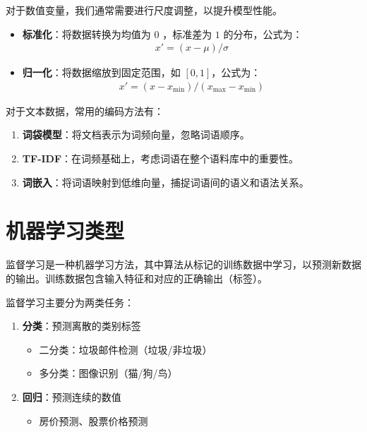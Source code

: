 \begin{example}[数值变量的标准化与归一化]
    对于数值变量，我们通常需要进行尺度调整，以提升模型性能。
    \begin{itemize}
        \item \textbf{标准化}：将数据转换为均值为 $0$ ，标准差为 $1$ 的分布，公式为：
              \begin{align*}
                  x' = (x - \mu) / \sigma
              \end{align*}
        \item \textbf{归一化}：将数据缩放到固定范围，如 $[0, 1]$，公式为：
              \begin{align*}
                  x' = (x - x_{\min}) / (x_{\max} - x_{\min})
              \end{align*}
    \end{itemize}
\end{example}

\begin{example}[文本数据的编码]
    对于文本数据，常用的编码方法有：
    \begin{enumerate}
        \item \textbf{词袋模型}：将文档表示为词频向量，忽略词语顺序。
        \item \textbf{TF-IDF}：在词频基础上，考虑词语在整个语料库中的重要性。
        \item \textbf{词嵌入}：将词语映射到低维向量，捕捉词语间的语义和语法关系。
    \end{enumerate}
\end{example}

\section{机器学习类型}

\begin{definition}[监督学习]
    监督学习是一种机器学习方法，其中算法从标记的训练数据中学习，以预测新数据的输出。训练数据包含输入特征和对应的正确输出（标签）。

    监督学习主要分为两类任务：
    \begin{enumerate}
        \item \textbf{分类}：预测离散的类别标签
              \begin{itemize}
                  \item 二分类：垃圾邮件检测（垃圾/非垃圾）
                  \item 多分类：图像识别（猫/狗/鸟）
              \end{itemize}
        \item \textbf{回归}：预测连续的数值
              \begin{itemize}
                  \item 房价预测、股票价格预测
              \end{itemize}
    \end{enumerate}
\end{definition}

